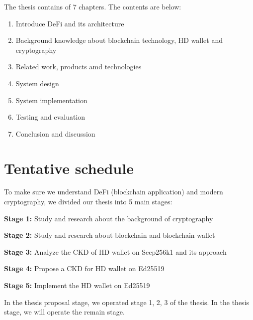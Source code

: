 The thesis contains of 7 chapters. The contents are below:

\begin{enumerate}
  \item Introduce DeFi and its architecture
  \item Background knowledge about blockchain technology, HD wallet and cryptography
  \item Related work, products amd technologies
  \item System design
  \item System implementation
  \item Testing and evaluation
  \item Conclusion and discussion
\end{enumerate}

\section{Tentative schedule}

To make sure we understand DeFi (blockchain application) and modern cryptography, we divided our thesis into 5 main stages:

\textbf{Stage 1:} Study and research about the background of cryptography

\textbf{Stage 2:} Study and research about blockchain and blockchain wallet

\textbf{Stage 3:} Analyze the CKD of HD wallet on Secp256k1 and its approach

\textbf{Stage 4:} Propose a CKD for HD wallet on Ed25519

\textbf{Stage 5:} Implement the HD wallet on Ed25519

In the thesis proposal stage, we operated stage 1, 2, 3 of the thesis. In the thesis stage, we will operate the remain stage.